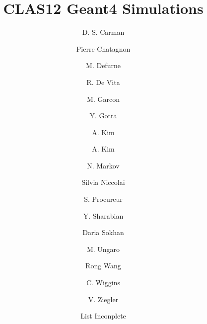 \title{CLAS12 Geant4 Simulations}




\author[A]{D. S. Carman}
\author[E]{Pierre Chatagnon}
\author[C]{M. Defurne}
\author[B]{R. De Vita}
\author[C]{M. Garcon}
\author[A]{Y. Gotra}
\author[D]{A. Kim}
\author[D]{A. Kim}
\author[C]{N. Markov}
\author[E]{Silvia Niccolai}
\author[C]{S. Procureur}
\author[A]{Y. Sharabian}
\author[E]{Daria Sokhan}
\author[A]{M. Ungaro}
\author[E]{Rong Wang}
\author[A]{C. Wiggins}
\author[A]{V. Ziegler}
\author[A]{List Inconplete}

\address[A]{Thomas Jefferson National Accelerator Facility, Newport News, VA, USA}
\address[B]{Istituto Nazionale Di Fisica Nucleare, Genova, Italy}
\address[C]{IRFU, CEA, Universit\`e Paris-Saclay, F-91191 Gif-sur-Yvette, France}
\address[D]{University of Connecticut, Storrs, Connecticut}
\address[E]{Universit\`e Paris-Sud, Institut de Physique Nucl\'eaire, Paris, France}
